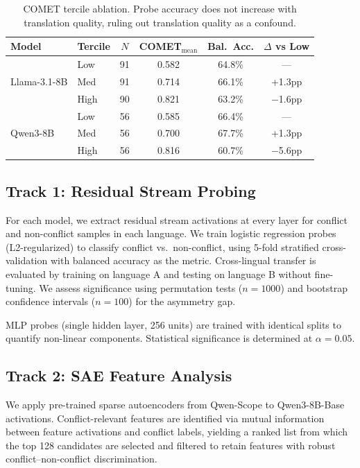 \documentclass{article}
\begin{document}
\begin{table}[t]
\centering
\caption{COMET tercile ablation. Probe accuracy does not increase with translation quality, ruling out translation quality as a confound.}
\label{tab:comet}
\small
\begin{tabular}{llcccc}
\toprule
Model & Tercile & $N$ & COMET$_{\text{mean}}$ & Bal.\ Acc. & $\Delta$ vs Low \\
\midrule
\multirow{3}{*}{Llama-3.1-8B} & Low & 91 & 0.582 & 64.8\% & --- \\
 & Med & 91 & 0.714 & 66.1\% & +1.3pp \\
 & High & 90 & 0.821 & 63.2\% & $-$1.6pp \\
\midrule
\multirow{3}{*}{Qwen3-8B} & Low & 56 & 0.585 & 66.4\% & --- \\
 & Med & 56 & 0.700 & 67.7\% & +1.3pp \\
 & High & 56 & 0.816 & 60.7\% & $-$5.6pp \\
\bottomrule
\end{tabular}
\end{table}

\subsection{Track 1: Residual Stream Probing}

For each model, we extract residual stream activations at every layer for conflict and non-conflict samples in each language. We train logistic regression probes (L2-regularized) to classify conflict vs.\ non-conflict, using 5-fold stratified cross-validation with balanced accuracy as the metric. Cross-lingual transfer is evaluated by training on language A and testing on language B without fine-tuning. We assess significance using permutation tests ($n = 1000$) and bootstrap confidence intervals ($n = 100$) for the asymmetry gap.

MLP probes (single hidden layer, 256 units) are trained with identical splits to quantify non-linear components. Statistical significance is determined at $\alpha = 0.05$.

\subsection{Track 2: SAE Feature Analysis}

We apply pre-trained sparse autoencoders from Qwen-Scope to Qwen3-8B-Base activations. Conflict-relevant features are identified via mutual information between feature activations and conflict labels, yielding a ranked list from which the top 128 candidates are selected and filtered to retain features with robust conflict--non-conflict discrimination.
\end{document}
